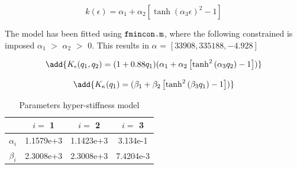 \begin{equation}
    k(\epsilon) =  \alpha_1 + \alpha_2 [\tanh({\alpha_3 \epsilon})^2 -1]
\end{equation}

The model has been fitted using $\verb+fmincon.m+$, where the following constrained is imposed
 $\alpha_1$  $>$ $\alpha_2$ $>$ 0. This results in $\alpha$ = $[33908,	335188,	-4.928]$







\begin{equation}
 \add{   K_\epsilon(q_1,q_2) = (1+0.88q_1)(\alpha_1 + \alpha_2\left[\tanh^2{(\alpha_3 q_2)}-1\right]) }
\end{equation}


\begin{equation}
 \add{   K_\kappa(q_1) = (\beta_1 + \beta_2\left[\tanh^2{(\beta_3 q_1)}-1\right]) }
\end{equation}


\begin{table}[H]
    \centering
\begin{tabular}{|c|c|c|c|} \hline
            &  $i = $ 1      &    $i = $    2   &  $i = $ 3  \\ \hline
   $\alpha_i$    &    1.1579e+3    & 1.1423e+3    & 3.134e-1 \\ \hline
   $\beta_i$     &  2.3008e+3    & 2.3008e+3    & 7.4204e-3 \\ \hline
\end{tabular}
    \caption{Parameters hyper-stiffness model}
    \label{tab:my_label}
\end{table}



